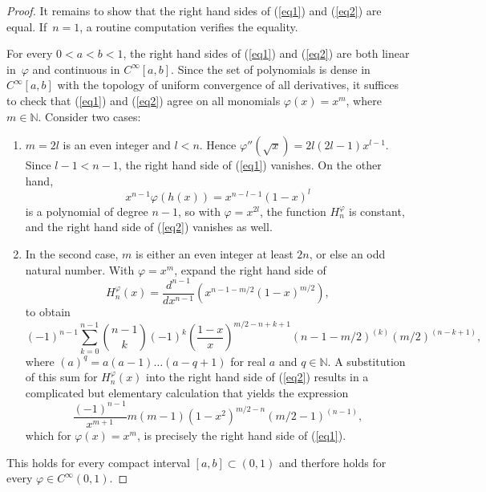 \documentclass[10pt,a4paper]{amsart}
\begin{document}
\begin{proof}
It remains to show that the right hand sides of (\ref{eq1}) and (\ref{eq2}) are equal. If~${n=1}$, a routine computation verifies the equality.

\medskip

For every $0<a<b<1$, the right hand sides of  (\ref{eq1}) and (\ref{eq2}) are  both linear in~$\varphi$ and continuous in 
$C^{\infty}[a,b]$. Since the set of polynomials is dense in $C^{\infty}[a,b]$ with the topology of uniform convergence of all derivatives, it suffices to check that (\ref{eq1}) and (\ref{eq2})  agree on all monomials $\varphi(x)=x^m$, where $m\in\mathbb{N}$. Consider two cases:
\begin{enumerate}
\item[1.] $m=2l$ is an even integer and $l<n$. Hence $\varphi''(\sqrt{x})=2l(2l-1)x^{l-1}$. Since $l-1<n-1$, the right hand side of (\ref{eq1}) vanishes. On the other hand,
\[ x^{n-1}\varphi(h(x))=x^{n-l-1}(1-x)^l \]
is a polynomial of degree $n-1$, so with $\varphi=x^{2l}$, the function $H_n^\varphi$ is  constant, and the right hand side of (\ref{eq2}) vanishes as well.
\item[2.] In the second case,  $m$ is either an even integer at least $2n$, or else an odd natural number. With $\varphi=x^m$, expand the right hand side of 
\[ H_n^\varphi(x)=\frac{d^{n-1}}{dx^{n-1}}(x^{n-1-m/2}(1-x)^{m/2}), \]
to obtain
\[ (-1)^{n-1}\sum_{k=0}^{n-1}{n-1\choose k}(-1)^k(\frac{1-x}{x})^{m/2-n+k+1}(n-1-m/2)^{(k)}(m/2)^{(n-k+1)},\]
where  $(a)^q=a(a-1)\dots (a-q+1)$ for real $a$ and $q\in\mathbb{N}$. 
A substitution of this sum for $H_n^\varphi(x)$ into the right hand side of (\ref{eq2}) results in a complicated but elementary calculation that yields the expression 
\begin{equation}\label{final}
\frac{(-1)^{n-1}}{x^{m+1}}m(m-1)(1-x^2)^{m/2-n}(m/2-1)^{(n-1)}, 
\end{equation}
which for  $\varphi(x)=x^m$, is precisely the right hand side of (\ref{eq1}). 
\end{enumerate}
This holds for every compact interval $[a,b]\subset (0,1)$ and therfore holds for every ${\varphi\in C^{\infty}(0,1)}$.
\end{proof}
\end{document}
